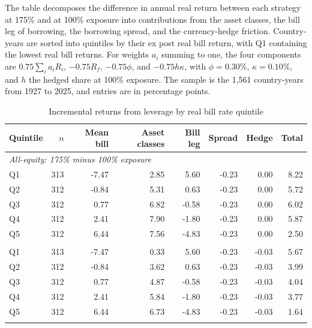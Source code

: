 \begin{table}[p]\centering
\caption{Incremental returns from leverage by real bill rate quintile}\label{tab:bill-quintiles}
\begin{minipage}{\linewidth}\small The table decomposes the difference in annual real return between each strategy at 175\% and at 100\% exposure into contributions from the asset classes, the bill leg of borrowing, the borrowing spread, and the currency-hedge friction. Country-years are sorted into quintiles by their ex post real bill return, with Q1 containing the lowest real bill returns. For weights $a_i$ summing to one, the four components are $0.75\sum_i a_iR_i$, $-0.75R_f$, $-0.75\phi$, and $-0.75h\kappa$, with $\phi=0.30\%$, $\kappa=0.10\%$, and $h$ the hedged share at 100\% exposure. The sample is the 1,561 country-years from 1927 to 2025, and entries are in percentage points.\end{minipage}
\medskip

\begin{tabular}{lrrrrrrr}\toprule
Quintile & $n$ & Mean bill & Asset classes & Bill leg & Spread & Hedge & Total \\
\midrule
\multicolumn{8}{l}{\textit{All-equity: 175\% minus 100\% exposure}} \\
Q1 & 313 & -7.47 & 2.85 & 5.60 & -0.23 & 0.00 & 8.22 \\
Q2 & 312 & -0.84 & 5.31 & 0.63 & -0.23 & 0.00 & 5.72 \\
Q3 & 312 & 0.77 & 6.82 & -0.58 & -0.23 & 0.00 & 6.02 \\
Q4 & 312 & 2.41 & 7.90 & -1.80 & -0.23 & 0.00 & 5.87 \\
Q5 & 312 & 6.44 & 7.56 & -4.83 & -0.23 & 0.00 & 2.50 \\
\addlinespace
\multicolumn{8}{l}{\textit{Proportional: 175\% minus 100\% exposure}} \\
Q1 & 313 & -7.47 & 0.33 & 5.60 & -0.23 & -0.03 & 5.67 \\
Q2 & 312 & -0.84 & 3.62 & 0.63 & -0.23 & -0.03 & 3.99 \\
Q3 & 312 & 0.77 & 4.87 & -0.58 & -0.23 & -0.03 & 4.04 \\
Q4 & 312 & 2.41 & 5.84 & -1.80 & -0.23 & -0.03 & 3.77 \\
Q5 & 312 & 6.44 & 6.73 & -4.83 & -0.23 & -0.03 & 1.64 \\
\addlinespace
\bottomrule\end{tabular}
\end{table}
